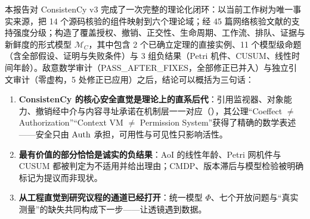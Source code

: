 本报告对 ConsistenCy v3 完成了一次完整的理论化闭环：以当前工作树为唯一事实来源，把 14 个源码核验的组件映射到六个理论域；经 45 篇网络核验文献的支持强度分级；构造了覆盖授权、撤销、正交性、生命周期、工作流、排队、证据与新鲜度的形式模型 $\mathcal{M}_C$，其中包含 2 个已确立定理的直接实例、11 个模型级命题（含全部假设、证明与失败条件）与 3 组负结果（Petri 机件、CUSUM、线性时间年龄）。敌意数学审计（PASS\_AFTER\_FIXES，全部修正已并入）与独立引文审计（零虚构，5 处修正已应用）之后，结论可以概括为三句话：
\begin{enumerate}[itemsep=0.1em]
  \item \textbf{ConsistenCy 的核心安全直觉是理论上的直系后代}：引用监视器、对象能力、撤销经中介与内容寻址承诺在机制层一一对应（\DIRECT），其公理“Coeffect $\neq$ Authorization”“Context VM $\neq$ Permission System”获得了精确的数学表述——安全只由 $\operatorname{Auth}$ 承担，可用性与可见性只影响活性。
  \item \textbf{最有价值的部分恰恰是诚实的负结果}：AoI 的线性年龄、Petri 网机件与 CUSUM 都被判定为不适用并给出理由；CMDP、版本滞后与模型检验被明确标记为提议而非现状。
  \item \textbf{从工程直觉到研究议程的通道已经打开}：统一模型 $\Phi$、七个开放问题与“真实测量”的缺失共同构成下一步——让透镜遇到数据。
\end{enumerate}
